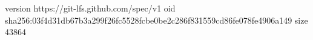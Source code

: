 version https://git-lfs.github.com/spec/v1
oid sha256:03f4d31db67b3a299f26fc5528fcbe0be2c286f831559cd86fe078fe4906a149
size 43864
